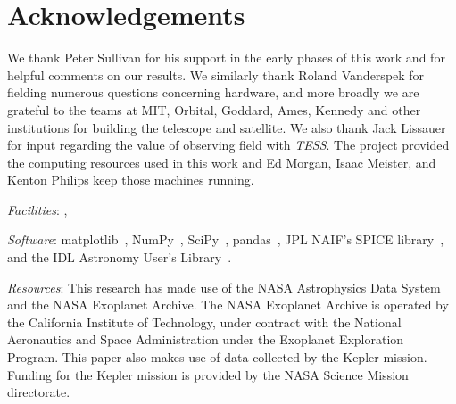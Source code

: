 \section*{Acknowledgements}
We thank Peter Sullivan for his support in the early phases of this 
work and for helpful comments on our results.
We similarly thank Roland Vanderspek for fielding numerous questions
concerning \tess hardware, and more broadly we are grateful to the teams 
at MIT, Orbital, Goddard, Ames, Kennedy and other institutions for 
building the telescope and satellite.
We also thank Jack Lissauer for input regarding the value of observing 
\keplers field with \textit{TESS}.
The \tess project provided the computing resources used in this work and Ed 
Morgan, Isaac Meister, and Kenton Philips keep those machines running.

\vspace{0.5cm}
\textit{Facilities}: \tess, \kepler

\textit{Software}: matplotlib~\citep{hunter_matplotlib_2007}, NumPy~\citep{walt_numpy_2011}, SciPy~\citep{jones_scipy_2001}, pandas~\citep{mckinneypandas}, JPL NAIF's SPICE library~\citep{acton_SPICE_1996}, and the IDL Astronomy User's Library~\citep{landsman_idl_1995}.

\textit{Resources}: This research has made use of the NASA Astrophysics Data System and the NASA Exoplanet Archive. The NASA Exoplanet Archive is operated by the California Institute of Technology, under contract with the National Aeronautics and Space Administration under the Exoplanet Exploration Program.
This paper also makes use of data collected by the Kepler mission. Funding for the Kepler mission is provided by the NASA Science Mission directorate.
